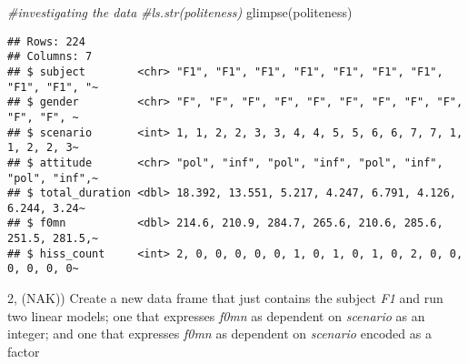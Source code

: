 \documentclass[
]{article}
\newenvironment{Shaded}{\begin{snugshade}}{\end{snugshade}}
\newcommand{\CommentTok}[1]{\textcolor[rgb]{0.56,0.35,0.01}{\textit{#1}}}
\newcommand{\FunctionTok}[1]{\textcolor[rgb]{0.00,0.00,0.00}{#1}}
\newcommand{\NormalTok}[1]{#1}
\newcommand{\OtherTok}[1]{\textcolor[rgb]{0.56,0.35,0.01}{#1}}
\newcommand{\SpecialCharTok}[1]{\textcolor[rgb]{0.00,0.00,0.00}{#1}}
\begin{document}
\begin{Shaded}
\begin{Highlighting}[]
\CommentTok{\#investigating the data}
\CommentTok{\#ls.str(politeness)}
\FunctionTok{glimpse}\NormalTok{(politeness)}
\end{Highlighting}
\end{Shaded}

\begin{verbatim}
## Rows: 224
## Columns: 7
## $ subject        <chr> "F1", "F1", "F1", "F1", "F1", "F1", "F1", "F1", "F1", "~
## $ gender         <chr> "F", "F", "F", "F", "F", "F", "F", "F", "F", "F", "F", ~
## $ scenario       <int> 1, 1, 2, 2, 3, 3, 4, 4, 5, 5, 6, 6, 7, 7, 1, 1, 2, 2, 3~
## $ attitude       <chr> "pol", "inf", "pol", "inf", "pol", "inf", "pol", "inf",~
## $ total_duration <dbl> 18.392, 13.551, 5.217, 4.247, 6.791, 4.126, 6.244, 3.24~
## $ f0mn           <dbl> 214.6, 210.9, 284.7, 265.6, 210.6, 285.6, 251.5, 281.5,~
## $ hiss_count     <int> 2, 0, 0, 0, 0, 0, 1, 0, 1, 0, 1, 0, 2, 0, 0, 0, 0, 0, 0~
\end{verbatim}

\begin{Shaded}
\end{Shaded}

2, (NAK)) Create a new data frame that just contains the subject
\emph{F1} and run two linear models; one that expresses \emph{f0mn} as
dependent on \emph{scenario} as an integer; and one that expresses
\emph{f0mn} as dependent on \emph{scenario} encoded as a factor
\end{document}
